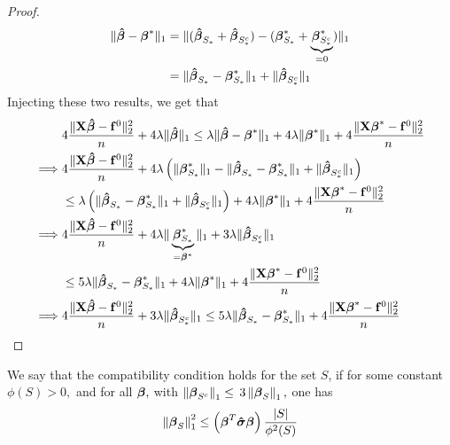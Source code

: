 \begin{proof}
    \begin{align*}
        \|\boldsymbol{\hat{\beta}}-\boldsymbol{\beta}^{*} \|_{1}
         & =  \| (\boldsymbol{\hat{\beta}}_{S_{*}} + \boldsymbol{\hat{\beta}}_{S_{*}^{c}}) - (\boldsymbol{\beta}_{S_{*}}^{*} + \underbrace{\boldsymbol{\beta}_{S_{*}^{c}}^*}_{=0}) \|_{1} \\
         & =  \| \boldsymbol{\hat{\beta}}_{S_{*}}-\boldsymbol{\beta}_{S_{*}}^{*} \|_{1} + \|\boldsymbol{\hat{\beta}}_{S_{*}^{c}} \|_{1}
    \end{align*}
    Injecting these two results, we get that
    \begin{align*}
                 & 4 \frac{\| \mathbf{X} \boldsymbol{\hat{\beta}} - \mathbf{f}^0 \|_{2}^{2}}{n} + 4 \lambda\| \boldsymbol{\hat{\beta}} \|_{1} \leq \lambda \| \boldsymbol{\hat{\beta}} - \boldsymbol{\beta}^* \|_{1} + 4 \lambda \| \boldsymbol{\beta}^*\|_{1} + 4\frac{\|\mathbf{X} \boldsymbol{\beta}^* - \mathbf{f}^0\|_{2}^{2}}{n} \\
        \implies &
        4 \frac{\| \mathbf{X} \boldsymbol{\hat{\beta}} - \mathbf{f}^0 \|_{2}^{2}}{n} + 4 \lambda \left( \|\boldsymbol{\beta}_{S_{*}}^{*} \|_{1} - \|\boldsymbol{\hat{\beta}}_{S_{*}}-\boldsymbol{\beta}_{S_{*}}^{*} \|_{1}+ \|\boldsymbol{\hat{\beta}}_{S_{*}^{c}} \|_{1} \right)                                \\
                 & \leq \lambda \left( \| \boldsymbol{\hat{\beta}}_{S_{*}}-\boldsymbol{\beta}_{S_{*}}^{*} \|_{1} + \|\boldsymbol{\hat{\beta}}_{S_{*}^{c}} \|_{1} \right) + 4 \lambda \| \boldsymbol{\beta}^*\|_{1} + 4\frac{\|\mathbf{X} \boldsymbol{\beta}^* - \mathbf{f}^0\|_{2}^{2}}{n}                    \\
        \implies &
        4 \frac{\| \mathbf{X} \boldsymbol{\hat{\beta}} - \mathbf{f}^0 \|_{2}^{2}}{n} + 4 \lambda \| \underbrace{\boldsymbol{\beta}_{S_{*}}^{*}}_{= \boldsymbol{\beta}^{*}} \|_{1} + 3 \lambda\|\boldsymbol{\hat{\beta}}_{S_{*}^{c}} \|_{1}                                                      \\
                 & \leq 5 \lambda \| \boldsymbol{\hat{\beta}}_{S_{*}}-\boldsymbol{\beta}_{S_{*}}^{*} \|_{1} + 4 \lambda \| \boldsymbol{\beta}^*\|_{1} + 4\frac{\|\mathbf{X} \boldsymbol{\beta}^* - \mathbf{f}^0\|_{2}^{2}}{n}                                                                \\
        \implies &
        4 \frac{\| \mathbf{X} \boldsymbol{\hat{\beta}} - \mathbf{f}^0 \|_{2}^{2}}{n} + 3 \lambda\|\boldsymbol{\hat{\beta}}_{S_{*}^{c}} \|_{1} \leq 5 \lambda \| \boldsymbol{\hat{\beta}}_{S_{*}}-\boldsymbol{\beta}_{S_{*}}^{*} \|_{1} + 4\frac{\|\mathbf{X} \boldsymbol{\beta}^* - \mathbf{f}^0\|_{2}^{2}}{n}           \\
    \end{align*}
\end{proof}


\begin{definition}
    We say that the compatibility condition holds for the set $S$, if for some constant $\phi(S)>0,$ and for all $\boldsymbol{\beta},$ with $\left\|\boldsymbol{\beta}_{S^{c}}\right\|_{1} \leq$ $3\left\|\boldsymbol{\beta}_{S}\right\|_{1},$ one has
    $$
        \left\|\boldsymbol{\beta}_{S}\right\|_{1}^{2} \leq\left(\boldsymbol{\beta}^{T} \boldsymbol{\hat{\sigma}} \boldsymbol{\beta}\right)\frac{|S|}{\phi^{2}(S)}
    $$
\end{definition}

